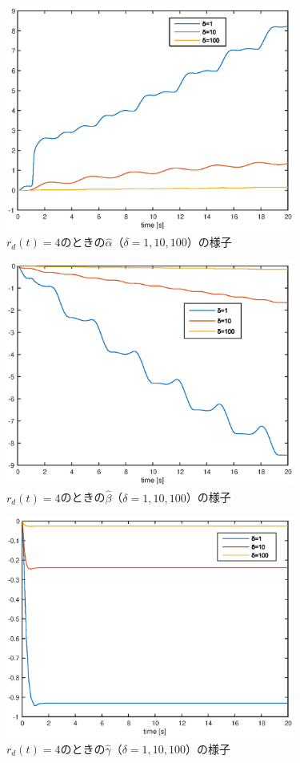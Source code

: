 \documentclass[a4paper,12pt]{jarticle}
\begin{document}
%
\begin{figure}[htb]
    \begin{center}
       \includegraphics[width=95mm]{fig/alpha_h_rd4.eps}
        \caption{$r_d(t)=4$のときの$\hat{\alpha}$（$\delta=1,10,100$）の様子}
        \label{fig:alpha_h_rd4}
    \end{center}
\end{figure}
%
%
\begin{figure}[htb]
    \begin{center}
       \includegraphics[width=95mm]{fig/beta_h_rd4.eps}
        \caption{$r_d(t)=4$のときの$\hat{\beta}$（$\delta=1,10,100$）の様子}
        \label{fig:beta_h_rd4}
    \end{center}
\end{figure}
%
%
\begin{figure}[htb]
    \begin{center}
       \includegraphics[width=95mm]{fig/gamma_h_rd4.eps}
        \caption{$r_d(t)=4$のときの$\hat{\gamma}$（$\delta=1,10,100$）の様子}
        \label{fig:gamma_h_rd4}
    \end{center}
\end{figure}
%
\end{document}
